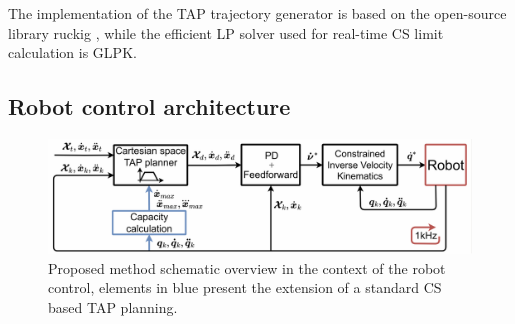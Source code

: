 


The implementation of the TAP trajectory generator is based on the open-source library ruckig \cite{ruckig}, while the efficient LP solver used for real-time CS limit calculation is GLPK\cite{glpk}.

\subsection{Robot control architecture}
\label{ch:qp}

\begin{figure}[!tb]
    \centering
    \includegraphics[width=\linewidth]{Papers/imgs/schema.pdf}
    \caption{Proposed method schematic overview in the context of the robot control, elements in blue present the extension of a standard CS based TAP planning.}
    \label{fig:schema}
\end{figure}

